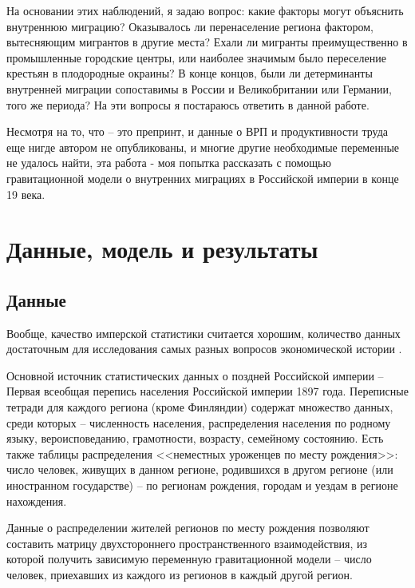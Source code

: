 \documentclass[a4paper,12pt]{article}
\let\oldsection\section
\renewcommand\section{\clearpage\oldsection}
\begin{document}
На основании этих наблюдений, я задаю вопрос: какие факторы могут объяснить внутреннюю миграцию? 
Оказывалось ли перенаселение региона фактором, вытесняющим мигрантов в другие места? Ехали ли мигранты преимущественно в промышленные городские центры, или наиболее значимым было переселение крестьян в плодородные окраины? В конце концов, были ли детерминанты внутренней миграции сопоставимы в России и Великобритании или Германии, того же периода? На эти вопросы я постараюсь ответить в данной работе.

Несмотря на то, что \citet{markevich_regional_2019} -- это препринт, и данные о ВРП и продуктивности труда еще нигде автором не опубликованы, и многие другие необходимые переменные не удалось найти, эта работа - моя попытка рассказать с помощью гравитационной модели о внутренних миграциях в Российской империи в конце 19 века.



\section{Данные, модель и результаты}

\subsection{Данные}

Вообще, качество имперской статистики считается хорошим, количество данных достаточным для исследования самых разных вопросов экономической истории \citep{markevich_regional_2019}.

Основной источник статистических данных о поздней Российской империи – Первая всеобщая перепись населения Российской империи 1897 года. Переписные тетради для каждого региона (кроме Финляндии) содержат множество данных, среди которых – численность населения, распределения населения по родному языку, вероисповеданию, грамотности, возрасту, семейному состоянию. Есть также таблицы распределения <<неместных уроженцев по месту рождения>>: число человек, живущих в данном регионе, родившихся в другом регионе (или иностранном государстве) – по регионам рождения, городам и уездам в регионе нахождения.

Данные о распределении жителей регионов по месту рождения позволяют составить матрицу двухстороннего пространственного взаимодействия, из которой получить зависимую переменную гравитационной модели -- число человек, приехавших из каждого из регионов в каждый другой регион. 
\end{document}
